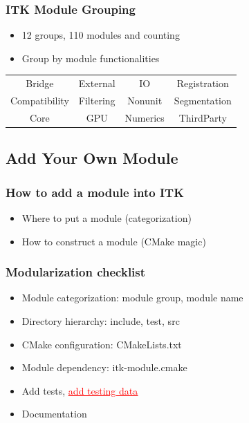 \begin{frame}
\frametitle{ITK Module Grouping}
\begin{itemize}
\item  12 groups, 110 modules and counting
\pause
\item  Group by module functionalities
\pause
\end{itemize}
\begin{tabular}{cccc}
Bridge     &    External   & IO        & Registration \\
Compatibility  & Filtering  & Nonunit   & Segmentation \\
Core           & GPU        & Numerics  & ThirdParty \\
\end{tabular}
\end{frame}

\subsection{Add Your Own Module}

\begin{frame}
\frametitle{How to add a module into ITK}
\begin{itemize}
\item Where to put a module (categorization)
\pause
\item How to construct a module (CMake magic)
\end{itemize}
\end{frame}


\begin{frame}
\frametitle{Modularization checklist}
\begin{itemize}
\item  Module categorization: module group, module name
\pause
\item  Directory hierarchy: include, test, src
\pause
\item  CMake configuration: CMakeLists.txt
\pause
\item  Module dependency: itk-module.cmake
\pause
\item  Add tests, \href{http://www.vtk.org/Wiki/ITK/Git/Develop/Data\#Workflow}{\textcolor{red}{\underline{add testing data}}}
\pause
\item  Documentation
\end{itemize}
\end{frame}


